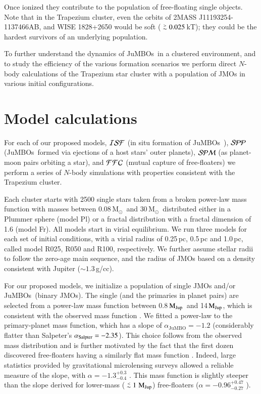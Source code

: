 \documentclass[submission,phys]{lib/SciPost}
\newcommand{\MSun}{\mbox{$\mathrm{{M}}_\odot$}}
\newcommand{\MJup}{\mbox{$\mathrm{{M}}_{\rm Jup}$}}
\def\apgt{\ {\raise-.5ex\hbox{$\buildrel>\over\sim$}}\ }
\def\aplt{\ {\raise-.5ex\hbox{$\buildrel<\over\sim$}}\ }
\newcommand{\jumbo}{\mbox{JuMBO}}
\newcommand{\jumbos}{\mbox{JuMBOs}}
\begin{document}
Once ionized they contribute to the population of free-floating single
objects.  Note that in the Trapezium cluster, even the orbits of 2MASS
J11193254-1137466AB, and WISE 1828+2650 would be soft ($\apgt
0.025$\,kT); they could be the hardest survivors of an underlying
population.

To further understand the dynamics of \jumbos\, in a clustered
environment, and to study the efficiency of the various formation
scenarios we perform direct $N$-body calculations of the Trapezium
star cluster with a population of JMOs in various
initial configurations.

\section{Model calculations}\label{Sect:Model}

For each of our proposed models, ${\cal ISF}$ (in situ formation of
\jumbos\ ), ${\cal SPP}$ (\jumbos\, formed via ejections of a host stars'
outer planets), ${\cal SPM}$ (as planet-moon pairs orbiting a star),
and ${\cal FFC}$ (mutual capture of free-floaters) we perform a
series of $N$-body simulations with properties consistent with the
Trapezium cluster.

Each cluster starts with 2500 single stars taken from a broken
power-law mass function \cite{2002Sci...295...82K} with masses between
$0.08$\,\MSun\, and $30$\,\MSun\, distributed either in a Plummer
sphere (model Pl) or a fractal distribution with a fractal dimension
of 1.6 (model Fr). All models start in virial equilibrium.  We run
three models for each set of initial conditions, with a virial radius
of 0.25\,pc, 0.5\,pc and 1.0\,pc, called model R025, R050 and R100,
respectively.  We further assume stellar radii to follow the zero-age
main sequence, and the radius of JMOs based on a density consistent
with Jupiter ($\sim 1.3$\,g/cc).

For our proposed models, we initialize a population of single
JMOs and/or \jumbos\, (binary JMOs). The single (and the primaries in
planet pairs) are selected from a power-law mass function between
0.8\,\MJup\, and 14\,\MJup, which is consistent with the observed mass
function \cite{2023arXiv231001231P}. We fitted a power-law to the
primary-planet mass function, which has a slope of $\alpha_{\jumbo}
=-1.2$ (considerably flatter than Salpeter's $\alpha_{\rm Salpter} =
-2.35$). This choice follows from the observed mass distribution and is 
further motivated by the fact that the first dozen discovered free-floaters 
having a similarly flat mass function \cite{2000MNRAS.314..858L}. Indeed, large 
statistics provided by gravitational microlensing surveys allowed a reliable
measure of the slope, with $\alpha = -1.3^{+0.3}_{-0.4}$
\cite{2011Natur.473..349S}. This mass function is slightly steeper
than the slope derived for lower-mass ($\aplt 1$\,\MJup) free-floaters
($\alpha = -0.96^{+0.47}_{-0.27}$ \cite{2023AJ....166..108S}).
\end{document}

